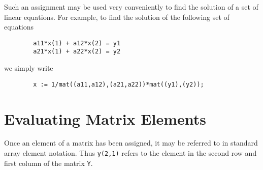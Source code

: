 Such an assignment may be used very conveniently to find the solution of a
set of linear equations. For example, to find the solution of the
following set of equations
\begin{verbatim}
        a11*x(1) + a12*x(2) = y1
        a21*x(1) + a22*x(2) = y2
\end{verbatim}
we simply write
\begin{verbatim}
        x := 1/mat((a11,a12),(a21,a22))*mat((y1),(y2));
\end{verbatim}

\section{Evaluating Matrix Elements}

Once an element of a matrix has been assigned, it may be referred to in
standard array element notation.  Thus {\tt y(2,1)} refers to the element
in the second row and first column of the matrix {\tt Y}.

